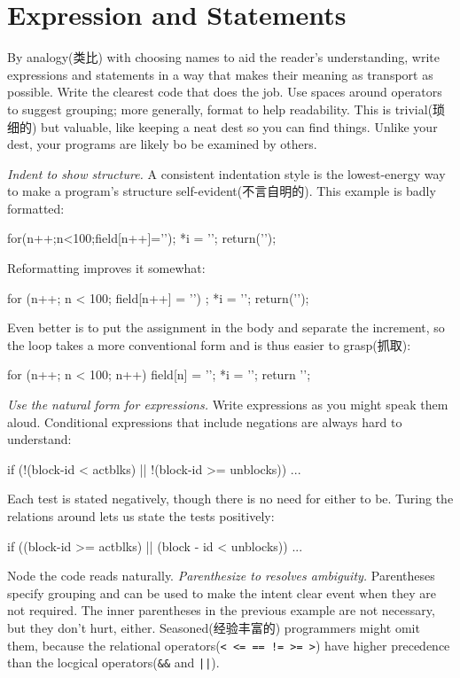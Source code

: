 \section{Expression and Statements}
\label{sec:exprstat}
By analogy(类比) with choosing names to aid the reader's understanding,
write expressions and statements in a way that makes their meaning as
transport as possible. Write the clearest code that does the job. Use
spaces around operators to suggest grouping; more generally, format to help
readability. This is trivial(琐细的) but valuable, like keeping a neat dest
so you can find things. Unlike your dest, your programs are likely bo be
examined by others.

\emph{Indent to show structure.} A consistent indentation style is the
lowest-energy way to make a program's structure self-evident(不言自明的).
This example is badly formatted:
\begin{badcode}
    for(n++;n<100;field[n++]='\0');
    *i = '\0'; return('\n');
\end{badcode}
Reformatting improves it somewhat:
\begin{badcode}
    for (n++; n < 100; field[n++] = '\0')
        ;
    *i = '\0';
    return('\n');
\end{badcode}
Even better is to put the assignment in the body and separate the
increment, so the loop takes a more conventional form and is thus easier to
grasp(抓取):
\begin{wellcode}
    for (n++; n < 100; n++)
        field[n] = '\0';
    *i = '\0';
    return '\n';
\end{wellcode}
\emph{Use the natural form for expressions.} Write expressions as you might
speak them aloud. Conditional expressions that include negations are always
hard to understand:
\begin{badcode}
    if (!(block-id < actblks) || !(block-id >= unblocks))
        ...
\end{badcode}
Each test is stated negatively, though there is no need for either to be.
Turing the relations around lets us state the tests positively:
\begin{wellcode}
    if ((block-id >= actblks) || (block - id < unblocks))
        ...
\end{wellcode}
Node the code reads naturally.
\emph{Parenthesize to resolves ambiguity.} Parentheses specify grouping and
can be used to make the intent clear event when they are not required. The
inner parentheses in the previous example are not necessary, but they don't
hurt, either. Seasoned(经验丰富的) programmers might omit them, because the
relational operators(\verb"< <= == != >= >") have higher precedence than
the locgical operators(\verb"&&" and \verb"||").

